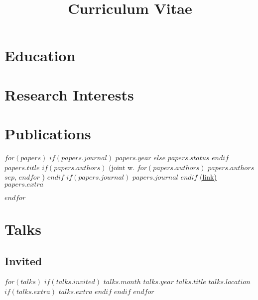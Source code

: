 \documentclass[11pt,letter,sans]{moderncv}        %
\title{Curriculum Vitae}                               %
\begin{document}
\makecvtitle

\bigskip

\section{Education}


\section{Research Interests}


\section{Publications}


$for(papers)$
\cventry
{
  $if(papers.journal)$
    $papers.year$
  $else$
    $papers.status$
  $endif$
}
{$papers.title$}
{%
$if(papers.authors)$%
  (joint w. $for(papers.authors)$%
    $papers.authors$$sep$,%
  $endfor$%
  )%
$endif$%
}
{%
$if(papers.journal)$%
  $papers.journal$%
$endif$%
}
{\href{$papers.link$}{(link)}}
{$papers.extra$}

$endfor$


\section{Talks}

\subsection{Invited}

$for(talks)$
$if(talks.invited)$
  \cventry
  {
  $talks.month$ $talks.year$
  }
  {$talks.title$}
  {$talks.location$}
  {}
  {}
  {%
  $if(talks.extra)$%
    $talks.extra$%
  $endif$%
  }
$endif$
$endfor$
\end{document}
